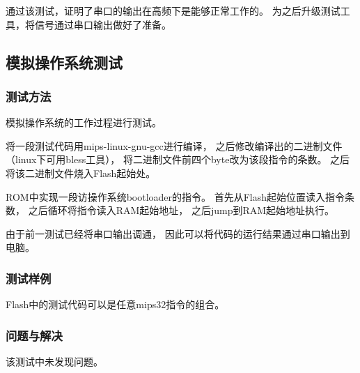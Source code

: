             通过该测试，证明了串口的输出在高频下是能够正常工作的。%
            为之后升级测试工具，将信号通过串口输出做好了准备。

    \subsection{模拟操作系统测试}
        \subsubsection{测试方法}
            模拟操作系统的工作过程进行测试。

            将一段测试代码用mips-linux-gnu-gcc进行编译，%
            之后修改编译出的二进制文件%
            （linux下可用bless工具），%
            将二进制文件前四个byte改为该段指令的条数。%
            之后将该二进制文件烧入Flash起始处。
            
            ROM中实现一段访操作系统bootloader的指令。%
            首先从Flash起始位置读入指令条数，%
            之后循环将指令读入RAM起始地址，%
            之后jump到RAM起始地址执行。

            由于前一测试已经将串口输出调通，%
            因此可以将代码的运行结果通过串口输出到电脑。

        \subsubsection{测试样例}
            Flash中的测试代码可以是任意mips32指令的组合。

        \subsubsection{问题与解决}
            该测试中未发现问题。%
            